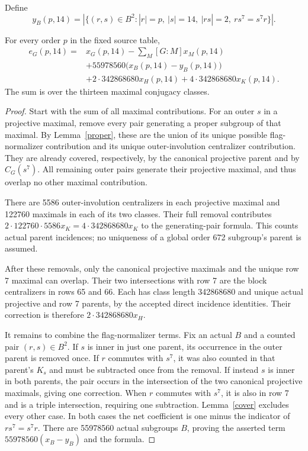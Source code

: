\documentclass[11pt,a4paper]{article}
\begin{document}
Define
\[
y_B(p,14)=|\{(r,s)\in B^2: |r|=p,\ |s|=14,\ |rs|=2,
                                      \ rs^7=s^7r\}|.
\]
\begin{theorem}\label{count}
For every order $p$ in the fixed source table,
\begin{align*}
e_G(p,14)={}&x_G(p,14)-\sum_M[G:M]x_M(p,14)\\
 &+55978560\bigl(x_B(p,14)-y_B(p,14)\bigr)\\
 &+2\cdot342868680x_H(p,14)
   +4\cdot342868680x_K(p,14).
\end{align*}
The sum is over the thirteen maximal conjugacy classes.
\end{theorem}
\begin{proof}
Start with the sum of all maximal contributions. For an outer
$s$ in a projective maximal, remove every pair generating a
proper subgroup of that maximal. By Lemma~\ref{proper}, these
are the union of its unique possible flag-normalizer contribution
and its unique outer-involution centralizer contribution.
They are already covered, respectively, by the canonical
projective parent and by $C_G(s^7)$. All remaining outer pairs
generate their projective maximal, and thus overlap no other
maximal contribution.

There are 5586 outer-involution centralizers in each projective
maximal and 122760 maximals in each of its two classes. Their
full removal contributes
$2\cdot122760\cdot5586x_K=4\cdot342868680x_K$ to the
generating-pair formula. This counts actual parent incidences;
no uniqueness of a global order 672 subgroup's parent is assumed.

After these removals, only the canonical projective maximals
and the unique row 7 maximal can overlap. Their two intersections
with row 7 are the block centralizers in rows 65 and 66. Each
has class length 342868680 and unique actual projective and
row 7 parents, by the accepted direct incidence identities.
Their correction is therefore $2\cdot342868680x_H$.

It remains to combine the flag-normalizer terms. Fix an actual
$B$ and a counted pair $(r,s)\in B^2$. If $s$ is inner in just
one parent, its occurrence in the outer parent is removed once.
If $r$ commutes with $s^7$, it was also counted in that parent's
$K_s$ and must be subtracted once from the removal.
If instead $s$ is inner in both parents, the pair occurs in the
intersection of the two canonical projective maximals, giving
one correction. When $r$ commutes with $s^7$, it is also in
row 7 and is a triple intersection, requiring one subtraction.
Lemma~\ref{cover} excludes every other case. In both cases the
net coefficient is one minus the indicator of $rs^7=s^7r$.
There are 55978560 actual subgroups $B$, proving the asserted
term $55978560(x_B-y_B)$ and the formula.
\end{proof}
\end{document}

